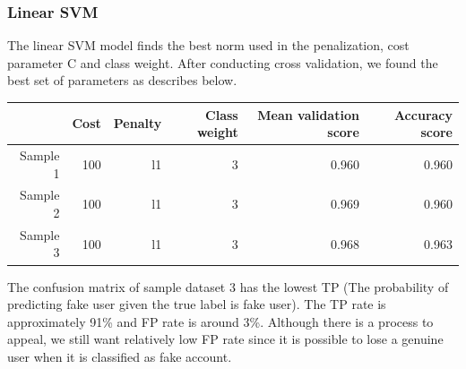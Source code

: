 \documentclass[a4paper, 12pt]{report}
\begin{document}
\subsubsection*{Linear SVM}
The linear SVM model finds the best norm used in the penalization, cost parameter C and class weight. After conducting cross validation, we found the best set of parameters as describes below.

\begin{table}[h!]
	 \label{tab:title} 
	\begin{center}
		\begin{tabular}{rrrrrr}
			\hline
			& Cost & Penalty & Class weight & Mean validation score & Accuracy score\\
			\hline
			Sample 1 & 100 & l1 & 3 & 0.960 & 0.960\\
			Sample 2 & 100 & l1 & 3 & 0.969 & 0.960\\
			Sample 3 & 100 & l1 & 3 & 0.968 & 0.963\\
			\hline
		\end{tabular}
	\end{center}
\end{table}

\noindent The confusion matrix of sample dataset 3 has the lowest TP (The probability of predicting fake user given the true label is fake user). The TP rate is approximately 91\% and FP rate is around 3\%. Although there is a process to appeal, we still want relatively low FP rate since it is possible to lose a genuine user when it is classified as fake account.
\end{document}
